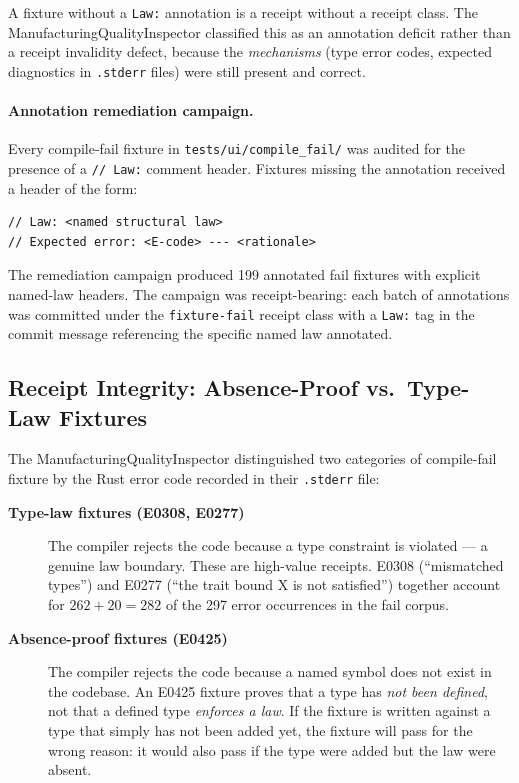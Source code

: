 A fixture without a \texttt{Law:} annotation is a receipt without a receipt
class. The ManufacturingQualityInspector classified this as an annotation
deficit rather than a receipt invalidity defect, because the \emph{mechanisms}
(type error codes, expected diagnostics in \texttt{.stderr} files) were still
present and correct.

\paragraph{Annotation remediation campaign.}
Every compile-fail fixture in \texttt{tests/ui/compile\_fail/} was audited for
the presence of a \texttt{// Law:} comment header. Fixtures missing the
annotation received a header of the form:

\begin{verbatim}
// Law: <named structural law>
// Expected error: <E-code> --- <rationale>
\end{verbatim}

The remediation campaign produced 199 annotated fail fixtures with explicit
named-law headers. The campaign was receipt-bearing: each batch of annotations
was committed under the \texttt{fixture-fail} receipt class with a
\texttt{Law:} tag in the commit message referencing the specific named law
annotated.

\subsection{Receipt Integrity: Absence-Proof vs.\ Type-Law Fixtures}

The ManufacturingQualityInspector distinguished two categories of compile-fail
fixture by the Rust error code recorded in their \texttt{.stderr} file:

\begin{description}
  \item[\textbf{Type-law fixtures (E0308, E0277)}]
    The compiler rejects the code because a type constraint is violated --- a
    genuine law boundary. These are high-value receipts. E0308 (``mismatched
    types'') and E0277 (``the trait bound X is not satisfied'') together
    account for $262 + 20 = 282$ of the 297 error occurrences in the fail
    corpus.

  \item[\textbf{Absence-proof fixtures (E0425)}]
    The compiler rejects the code because a named symbol does not exist in the
    codebase. An E0425 fixture proves that a type has \emph{not been defined},
    not that a defined type \emph{enforces a law}. If the fixture is written
    against a type that simply has not been added yet, the fixture will pass for
    the wrong reason: it would also pass if the type were added but the law were
    absent.
\end{description}

